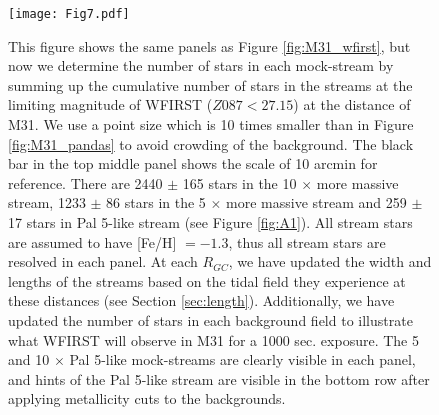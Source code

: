 \documentclass[twocolumn]{aastex62}
\begin{document}
\begin{figure}
\centerline{\texttt{[image: Fig7.pdf]}}
\caption{This figure shows the same panels as Figure \ref{fig:M31_wfirst}, but now we determine the number of stars in each mock-stream by summing up the cumulative number of stars in the streams at the limiting magnitude of WFIRST ($Z087 < 27.15$) at the distance of M31. We use a point size which is 10 times smaller than in Figure \ref{fig:M31_pandas} to avoid crowding of the background. The black bar in the top middle panel shows the scale of 10 arcmin for reference. There are 2440 $\pm$ 165 stars in the 10 $\times$ more massive stream, 1233 $\pm$ 86 stars in the 5 $\times$ more massive stream and 259 $\pm$ 17 stars in Pal 5-like stream (see Figure \ref{fig:A1}).  All stream stars are assumed to have [Fe/H] $= -1.3$, thus all stream stars are resolved in each panel. At each $R_{GC}$, we have updated the width and lengths of the streams based on the tidal field they experience at these distances (see Section \ref{sec:length}). Additionally, we have updated the number of stars in each background field to illustrate what WFIRST will observe in M31 for a 1000 sec. exposure.  
The 5 and 10 $\times$ Pal 5-like mock-streams are clearly visible in each panel, and hints of the Pal 5-like stream are visible in the bottom row after applying metallicity cuts to the backgrounds.} 
\label{fig:A2}
\end{figure}
\end{document}
